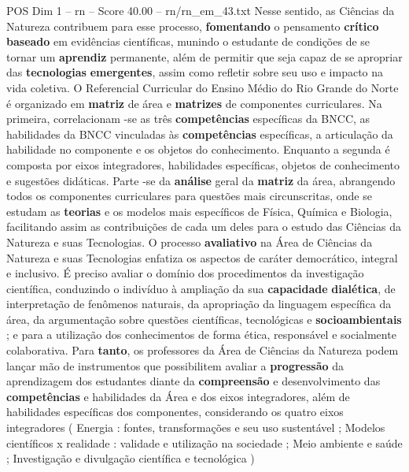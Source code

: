 \begin{textsample}{POS Dim 1 – rn – Score 40.00 – rn/rn\_em\_43.txt}
Nesse sentido, as Ciências da Natureza contribuem para esse processo, \textbf{fomentando} o pensamento \textbf{crítico} \textbf{baseado} em evidências científicas, munindo o estudante de condições de se tornar um \textbf{aprendiz} permanente, além de permitir que seja capaz de se apropriar das \textbf{tecnologias} \textbf{emergentes}, assim como refletir sobre seu uso e impacto na vida coletiva.
O Referencial Curricular do Ensino Médio do Rio Grande do Norte é organizado em \textbf{matriz} de área e \textbf{matrizes} de componentes curriculares.
Na primeira, correlacionam -se as três \textbf{competências} específicas da BNCC, as habilidades da BNCC vinculadas às \textbf{competências} específicas, a articulação da habilidade no componente e os objetos do conhecimento.
Enquanto a segunda é composta por eixos integradores, habilidades específicas, objetos de conhecimento e sugestões didáticas.
Parte -se da \textbf{análise} geral da \textbf{matriz} da área, abrangendo todos os componentes curriculares para questões mais circunscritas, onde se estudam as \textbf{teorias} e os modelos mais específicos de Física, Química e Biologia, facilitando assim as contribuições de cada um deles para o estudo das Ciências da Natureza e suas Tecnologias.
O processo \textbf{avaliativo} na Área de Ciências da Natureza e suas Tecnologias enfatiza os aspectos de caráter democrático, integral e inclusivo.
É preciso avaliar o domínio dos procedimentos da investigação científica, conduzindo o indivíduo à ampliação da sua \textbf{capacidade} \textbf{dialética}, de interpretação de fenômenos naturais, da apropriação da linguagem específica da área, da argumentação sobre questões científicas, tecnológicas e \textbf{socioambientais} ; e para a utilização dos conhecimentos de forma ética, responsável e socialmente colaborativa.
Para \textbf{tanto}, os professores da Área de Ciências da Natureza podem lançar mão de instrumentos que possibilitem avaliar a \textbf{progressão} da aprendizagem dos estudantes diante da \textbf{compreensão} e desenvolvimento das \textbf{competências} e habilidades da Área e dos eixos integradores, além de habilidades específicas dos componentes, considerando os quatro eixos integradores ( Energia : fontes, transformações e seu uso sustentável ; Modelos científicos x realidade : validade e utilização na sociedade ; Meio ambiente e saúde ; Investigação e divulgação científica e tecnológica )

\end{textsample}
